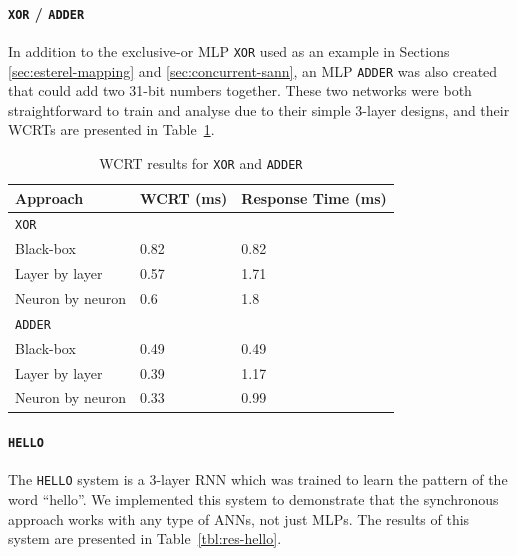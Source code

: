 \paragraph{\texttt{XOR} / \texttt{ADDER}}
\label{sec:xor-and-adder}

In addition to the exclusive-or \ac{MLP} \texttt{XOR} used as an example in Sections
\ref{sec:esterel-mapping} and \ref{sec:concurrent-sann},
an \ac{MLP} \texttt{ADDER} was also created that could add two 31-bit numbers together. 
These two networks were both straightforward to train and analyse 
due to their simple 3-layer designs, and their \acp{WCRT} are presented in Table~\ref{tbl:res-xor-adder}.

\begin{table}[H]
	\centering
	\caption{\ac{WCRT} results for \texttt{XOR} and \texttt{ADDER}}
	\label{tbl:res-xor-adder}
	\begin{tabular}{|l|l|l|}
		\hline
		Approach         & WCRT (ms) & Response Time (ms)\\ \hline
		\multicolumn{3}{|l|}{\texttt{XOR}}  \\ \hline
		Black-box        & 0.82 & 0.82   \\ 
		Layer by layer   & 0.57 & 1.71  \\ 
		Neuron by neuron & 0.6  & 1.8 \\  \hline
		\multicolumn{3}{|l|}{\texttt{ADDER}}  \\ \hline
		Black-box        & 0.49 & 0.49   \\ 
		Layer by layer   & 0.39 & 1.17  \\ 
		Neuron by neuron & 0.33 & 0.99 \\  \hline
	\end{tabular}
\end{table}

\paragraph{\texttt{HELLO}}

The \texttt{HELLO} system is a 3-layer \ac{RNN} which was trained to learn the pattern of the word ``hello''. 
We implemented this system to demonstrate that the synchronous
approach works with any type of \acp{ANN}, not just \acp{MLP}.
The results of this system are presented in Table~\ref{tbl:res-hello}.

